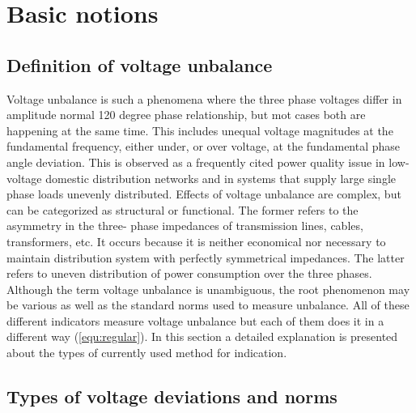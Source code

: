\chapter{Basic notions}

	\section{Definition of voltage unbalance}
	
	Voltage unbalance is such a phenomena where the three phase voltages differ in amplitude normal 120 degree phase relationship, but mot cases both are happening at the same time. This includes unequal voltage magnitudes at the fundamental frequency, either under, or over voltage, at the fundamental phase angle deviation. This is observed as a frequently cited power quality issue in low-voltage domestic distribution networks and in systems that supply large single phase loads unevenly distributed. Effects of voltage unbalance are complex, but can be categorized as structural or functional. The former refers to the asymmetry in the three- phase impedances of transmission lines, cables, transformers, etc. It occurs because it is neither economical nor necessary to maintain distribution system with perfectly symmetrical impedances. The latter refers to uneven distribution of power consumption over the three phases. Although the term voltage unbalance is unambiguous, the root phenomenon may be various as well as the standard norms used to measure unbalance. All of these different indicators measure voltage unbalance but each of them does it in a different way (\ref{equ:regular}). In this section a detailed explanation is presented about the types of currently used method for indication.
	
	\section{Types of voltage deviations and norms}


